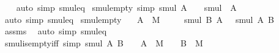\begin{isabellebody}
%
\isadelimproof
\ \ %
\endisadelimproof
%
\isatagproof
{}\isamarkupfalse%
\ {\isacharparenleft}{\kern0pt}auto\ simp{\isacharcolon}{\kern0pt}\ smul{\isacharunderscore}{\kern0pt}eq{\isacharparenright}{\kern0pt}%
\endisatagproof
{\isafoldproof}%
%
\isadelimproof
\isanewline
%
\endisadelimproof
\isanewline
{}\isamarkupfalse%
\ smul{\isacharunderscore}{\kern0pt}empty\ {\isacharbrackleft}{\kern0pt}simp{\isacharbrackright}{\kern0pt}{\isacharcolon}{\kern0pt}\ {\isachardoublequoteopen}smul\ A\ {\isacharbraceleft}{\kern0pt}{\isacharbraceright}{\kern0pt}\ {\isacharequal}{\kern0pt}\ {\isacharbraceleft}{\kern0pt}{\isacharbraceright}{\kern0pt}{\isachardoublequoteclose}\ {\isachardoublequoteopen}smul\ {\isacharbraceleft}{\kern0pt}{\isacharbraceright}{\kern0pt}\ A\ {\isacharequal}{\kern0pt}\ {\isacharbraceleft}{\kern0pt}{\isacharbraceright}{\kern0pt}{\isachardoublequoteclose}\isanewline
%
\isadelimproof
\ \ %
\endisadelimproof
%
\isatagproof
{}\isamarkupfalse%
\ {\isacharparenleft}{\kern0pt}auto\ simp{\isacharcolon}{\kern0pt}\ smul{\isacharunderscore}{\kern0pt}eq{\isacharparenright}{\kern0pt}%
\endisatagproof
{\isafoldproof}%
%
\isadelimproof
\isanewline
%
\endisadelimproof
\isanewline
{}\isamarkupfalse%
\ smul{\isacharunderscore}{\kern0pt}empty{\isacharprime}{\kern0pt}{\isacharcolon}{\kern0pt}\isanewline
\ \ \ {\isachardoublequoteopen}A\ {\isasyminter}\ M\ {\isacharequal}{\kern0pt}\ {\isacharbraceleft}{\kern0pt}{\isacharbraceright}{\kern0pt}{\isachardoublequoteclose}\isanewline
\ \ \ {\isachardoublequoteopen}smul\ B\ A\ {\isacharequal}{\kern0pt}\ {\isacharbraceleft}{\kern0pt}{\isacharbraceright}{\kern0pt}{\isachardoublequoteclose}\ {\isachardoublequoteopen}smul\ A\ B\ {\isacharequal}{\kern0pt}\ {\isacharbraceleft}{\kern0pt}{\isacharbraceright}{\kern0pt}{\isachardoublequoteclose}\isanewline
%
\isadelimproof
\ \ %
\endisadelimproof
%
\isatagproof
{}\isamarkupfalse%
\ assms\ \isamarkupfalse%
\ {\isacharparenleft}{\kern0pt}auto\ simp{\isacharcolon}{\kern0pt}\ smul{\isacharunderscore}{\kern0pt}eq{\isacharparenright}{\kern0pt}%
\endisatagproof
{\isafoldproof}%
%
\isadelimproof
\isanewline
%
\endisadelimproof
\isanewline
{}\isamarkupfalse%
\ smul{\isacharunderscore}{\kern0pt}is{\isacharunderscore}{\kern0pt}empty{\isacharunderscore}{\kern0pt}iff\ {\isacharbrackleft}{\kern0pt}simp{\isacharbrackright}{\kern0pt}{\isacharcolon}{\kern0pt}\ {\isachardoublequoteopen}smul\ A\ B\ {\isacharequal}{\kern0pt}\ {\isacharbraceleft}{\kern0pt}{\isacharbraceright}{\kern0pt}\ {\isasymlongleftrightarrow}\ A\ {\isasyminter}\ M\ {\isacharequal}{\kern0pt}\ {\isacharbraceleft}{\kern0pt}{\isacharbraceright}{\kern0pt}\ {\isasymor}\ B\ {\isasyminter}\ M\ {\isacharequal}{\kern0pt}\ {\isacharbraceleft}{\kern0pt}{\isacharbraceright}{\kern0pt}{\isachardoublequoteclose}\isanewline

\end{isabellebody}
